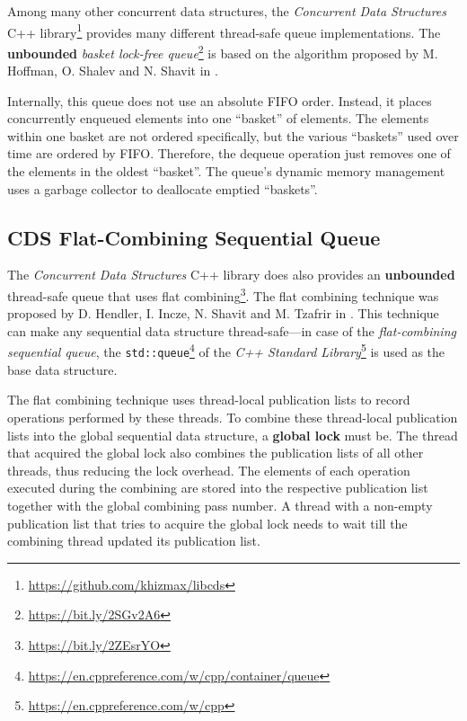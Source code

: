 	Among many other concurrent data structures, the \textit{Concurrent Data Structures} C++ library\footnote{\url{https://github.com/khizmax/libcds}} provides many different thread-safe queue implementations. The \textbf{unbounded} \emph{basket lock-free queue}\footnote{\url{https://bit.ly/2SGv2A6}} is based on the algorithm proposed by M. Hoffman, O. Shalev and N. Shavit in \cite{Hoffman:2007}.
	
	Internally, this queue does not use an absolute FIFO order. Instead, it places concurrently enqueued elements into one ``basket'' of elements. The elements within one basket are not ordered specifically, but the various ``baskets'' used over time are ordered by FIFO. Therefore, the dequeue operation just removes one of the elements in the oldest ``basket''. The queue's dynamic memory management uses a garbage collector to deallocate emptied ``baskets''.

\subsection[CDS FCQueue]{CDS Flat-Combining Sequential Queue} \label{subsec:cds-fc}

	The \textit{Concurrent Data Structures} C++ library does also provides an \textbf{unbounded} thread-safe queue that uses flat combining\footnote{\url{https://bit.ly/2ZEsrYO}}. The flat combining technique was proposed by D. Hendler, I. Incze, N. Shavit and M. Tzafrir in \cite{Hendler:2010}.  This technique can make any sequential data structure thread-safe---in case of the \emph{flat-combining sequential queue}, the \texttt{std::queue}\footnote{\url{https://en.cppreference.com/w/cpp/container/queue}} of the \textit{C++ Standard Library}\footnote{\url{https://en.cppreference.com/w/cpp}} is used as the base data structure.
	
	The flat combining technique uses thread-local publication lists to record operations performed by these threads. To combine these thread-local publication lists into the global sequential data structure, a \textbf{global lock} must be. The thread that acquired the global lock also combines the publication lists of all other threads, thus reducing the lock overhead. The elements of each operation executed during the combining are stored into the respective publication list together with the global combining pass number. A thread with a non-empty publication list that tries to acquire the global lock needs to wait till the combining thread updated its publication list.

